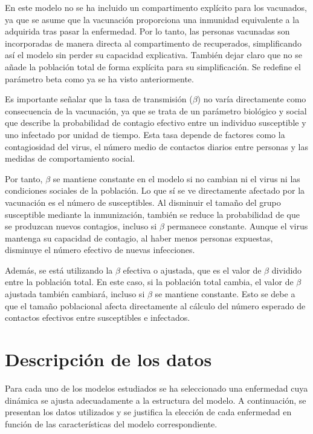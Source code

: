 En este modelo no se ha incluido un compartimento explícito para los vacunados, ya que se asume que la vacunación proporciona una inmunidad equivalente a la adquirida tras pasar la enfermedad. Por lo tanto, las personas vacunadas son incorporadas de manera directa al compartimento de recuperados, simplificando así el modelo sin perder su capacidad explicativa. También dejar claro que no se añade la población total de forma explícita para su simplificación. Se redefine el parámetro beta como ya se ha visto anteriormente.

Es importante señalar que la tasa de transmisión ($\beta$) no varía directamente como consecuencia de la vacunación, ya que se trata de un parámetro biológico y social que describe la probabilidad de contagio efectivo entre un individuo susceptible y uno infectado por unidad de tiempo. Esta tasa depende de factores como la contagiosidad del virus, el número medio de contactos diarios entre personas y las medidas de comportamiento social.

Por tanto, $\beta$ se mantiene constante en el modelo si no cambian ni el virus ni las condiciones sociales de la población. Lo que sí se ve directamente afectado por la vacunación es el número de susceptibles. Al disminuir el tamaño del grupo susceptible mediante la inmunización, también se reduce la probabilidad de que se produzcan nuevos contagios, incluso si $\beta$ permanece constante. Aunque el virus mantenga su capacidad de contagio, al haber menos personas expuestas, disminuye el número efectivo de nuevas infecciones.

Además, se está utilizando la $\beta$ efectiva o ajustada, que es el valor de $\beta$ dividido entre la población total. En este caso, si la población total cambia, el valor de $\beta$ ajustada también cambiará, incluso si $\beta$ se mantiene constante. Esto se debe a que el tamaño poblacional afecta directamente al cálculo del número esperado de contactos efectivos entre susceptibles e infectados.












\section{Descripción de los datos}
Para cada uno de los modelos estudiados se ha seleccionado una enfermedad cuya dinámica se ajusta adecuadamente a la estructura del modelo. A continuación, se presentan los datos utilizados y se justifica la elección de cada enfermedad en función de las características del modelo correspondiente.

